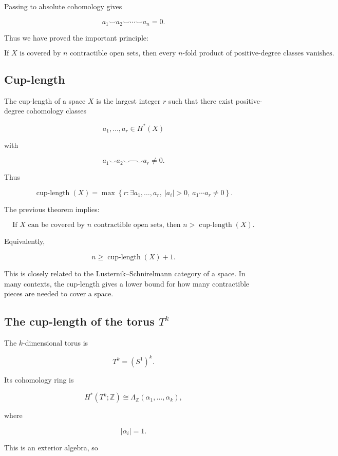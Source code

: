 \documentclass[12pt,a4paper]{article}
\theoremstyle{notespace}
\begin{document}
Passing to absolute cohomology gives

\[
\boxed{
	a_1\smile a_2\smile\cdots\smile a_n=0.
}
\]

Thus we have proved the important principle:

\[
\boxed{
	\text{If }X\text{ is covered by }n\text{ contractible open sets, then every }n\text{-fold product of positive-degree classes vanishes.}
}
\]

\subsection{Cup-length}

The cup-length of a space \(X\) is the largest integer \(r\) such that there exist positive-degree cohomology classes

\[
a_1,\dots,a_r\in H^*(X)
\]

with

\[
a_1\smile a_2\smile\cdots\smile a_r\neq 0.
\]

Thus

\[
\operatorname{cup\text{-}length}(X)
=
\max
\left\{
r:
\exists a_1,\dots,a_r,\ |a_i|>0,\ 
a_1\cdots a_r\neq 0
\right\}.
\]

The previous theorem implies:

\[
\boxed{
	\text{If }X\text{ can be covered by }n\text{ contractible open sets, then }
	n>\operatorname{cup\text{-}length}(X).
}
\]

Equivalently,

\[
\boxed{
	n\geq \operatorname{cup\text{-}length}(X)+1.
}
\]

This is closely related to the Lusternik--Schnirelmann category of a space. In many contexts, the cup-length gives a lower bound for how many contractible pieces are needed to cover a space.

\subsection{The cup-length of the torus \(T^k\)}

The \(k\)-dimensional torus is

\[
T^k=(S^1)^k.
\]

Its cohomology ring is

\[
H^*(T^k;\mathbb Z)
\cong
\Lambda_{\mathbb Z}(\alpha_1,\dots,\alpha_k),
\]

where

\[
|\alpha_i|=1.
\]

This is an exterior algebra, so
\end{document}
